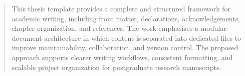 \begin{abstract}
This thesis template provides a complete and structured framework for academic
writing, including front matter, declarations, acknowledgements, chapter
organization, and references. The work emphasizes a modular document
architecture in which content is separated into dedicated files to improve
maintainability, collaboration, and version control. The proposed approach
supports clearer writing workflows, consistent formatting, and scalable project
organization for postgraduate research manuscripts.

\end{abstract}
